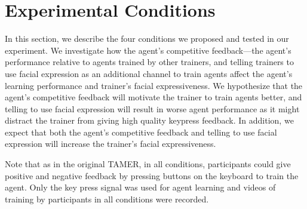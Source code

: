 \documentclass[10pt,journal,compsoc]{IEEEtran}
\begin{document}
\section{Experimental Conditions}
\label{sec:cons}


In this section, we describe the four conditions we proposed and tested in our experiment. We investigate how the agent's competitive feedback---the agent's performance relative to agents trained by other trainers, and telling trainers to use facial expression as an additional channel to train agents affect %
the agent's learning performance and trainer's facial expressiveness. We hypothesize that the agent's competitive feedback will motivate the trainer to train agents better, and telling to use facial expression will %
result in worse agent performance as it might distract the trainer from giving high quality keypress feedback. In addition, we expect that both the agent's competitive feedback and telling to use facial expression will increase the trainer's facial expressiveness.

Note that as in the original TAMER, %
in all conditions, participants could give positive and negative feedback by pressing buttons on the keyboard to train the agent. Only the key press signal was used for agent learning and videos of training by participants in all conditions were recorded. 
\end{document}
